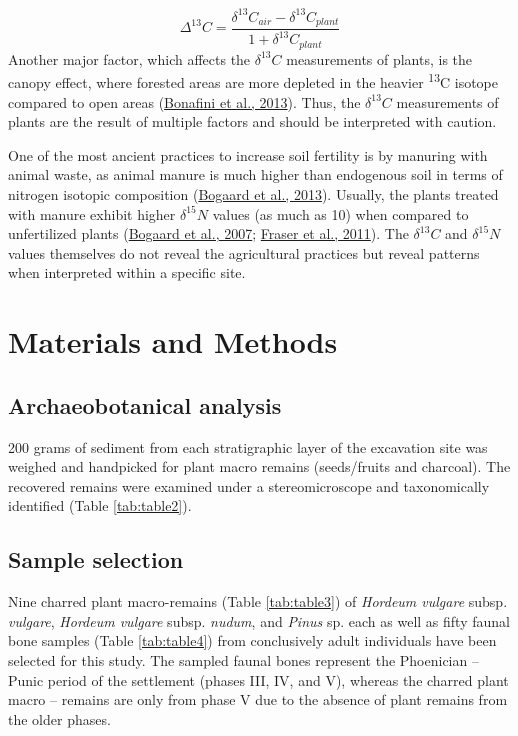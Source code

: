 \documentclass[preprint, 3p, authoryear]{elsarticle} %
\begin{document}
\[\Delta^{13}C = \frac{\delta ^{13}C_{air} - \delta ^{13}C_{plant}}{1+\delta ^{13}C_{plant}}\] Another major factor, which affects the \(\delta ^{13}C\) measurements of plants, is the canopy effect, where forested areas are more depleted in the heavier \textsuperscript{13}C isotope compared to open areas (\protect\hyperlink{ref-bonafini_etal13}{Bonafini et al., 2013}). Thus, the \(\delta ^{13}C\) measurements of plants are the result of multiple factors and should be interpreted with caution.

One of the most ancient practices to increase soil fertility is by manuring with animal waste, as animal manure is much higher than endogenous soil in terms of nitrogen isotopic composition (\protect\hyperlink{ref-bogaard_etal13}{Bogaard et al., 2013}). Usually, the plants treated with manure exhibit higher \(\delta ^{15}N\) values (as much as 10\text{\textperthousand}) when compared to unfertilized plants (\protect\hyperlink{ref-bogaard_etal07}{Bogaard et al., 2007}; \protect\hyperlink{ref-fraser_etal11}{Fraser et al., 2011}). The \(\delta ^{13}C\) and \(\delta ^{15}N\) values themselves do not reveal the agricultural practices but reveal patterns when interpreted within a specific site.

\hypertarget{materials-and-methods}{%
\section{Materials and Methods}\label{materials-and-methods}}

\hypertarget{archaeobotanical-analysis}{%
\subsection{Archaeobotanical analysis}\label{archaeobotanical-analysis}}

200 grams of sediment from each stratigraphic layer of the excavation site was weighed and handpicked for plant macro remains (seeds/fruits and charcoal). The recovered remains were examined under a stereomicroscope and taxonomically identified (Table \ref{tab:table2}).

\hypertarget{sample-selection}{%
\subsection{Sample selection}\label{sample-selection}}

Nine charred plant macro-remains (Table \ref{tab:table3}) of \emph{Hordeum vulgare} subsp. \emph{vulgare}, \emph{Hordeum vulgare} subsp. \emph{nudum}, and \emph{Pinus} sp. each as well as fifty faunal bone samples (Table \ref{tab:table4}) from conclusively adult individuals have been selected for this study. The sampled faunal bones represent the Phoenician -- Punic period of the settlement (phases III, IV, and V), whereas the charred plant macro -- remains are only from phase V due to the absence of plant remains from the older phases.
\end{document}
